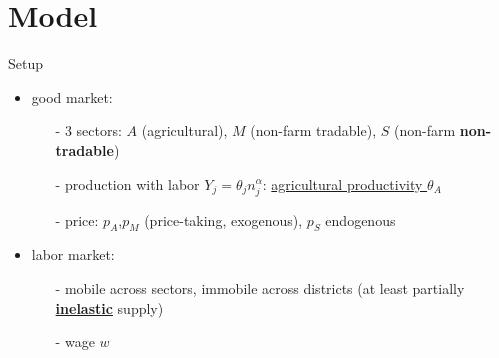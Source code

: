 \section{Model}
    
    \frame{\sectionpage}

    \begin{frame}{Setup}
        \begin{itemize}
            \item<+-> good market:
            \begin{itemize}
                \item[-] 3 sectors: $A$ {\footnotesize(agricultural)}, $M$ {\footnotesize(non-farm tradable)}, \textcolor{mygreen}{$S$ {\footnotesize (non-farm \textbf{non-tradable})}}
                \item[-] production with labor $Y_j=\theta_jn_j^{\alpha}$: \underline{agricultural productivity $\theta_A$}
                \item[-] price: $p_A$,$p_M$ (price-taking, exogenous), $p_S$ endogenous
            \end{itemize}
            \item<+-> labor market:
            \begin{itemize}
                \item[-] mobile across sectors, immobile across districts (at least partially \textbf{\color{mygreen}\underline{inelastic}} supply)
                \item[-] wage $w$
            \end{itemize}
        \end{itemize}
    \end{frame}

